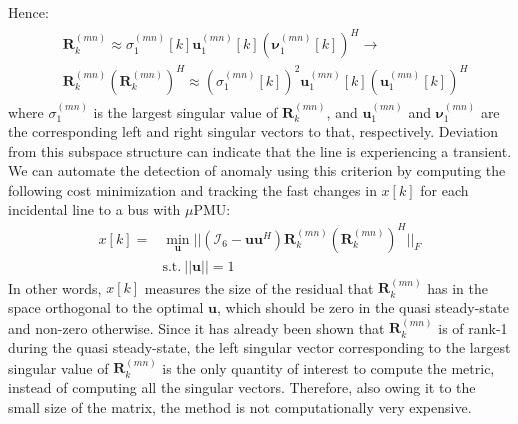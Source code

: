 \documentclass[twocolumn]{IEEEtran}
\newcommand{\mup}{\mu \text{PMU}}
\newcommand{\bs}{\boldsymbol}
\begin{document}
Hence:
\begin{align}
\begin{split}
&\bs R^{(mn)}_k \approx \sigma^{(mn)}_1[k]\bs u^{(mn)}_1[k] (\bs \nu^{(mn)}_1[k])^H\rightarrow \\
&\bs R^{(mn)}_k (\bs R_k ^{(mn)})^H\approx (\sigma^{(mn)}_1[k])^2\bs u^{(mn)}_1[k] (\bs u^{(mn)}_1[k])^H
\end{split}
\end{align}
where $\sigma^{(mn)}_1$ is the largest singular value of $\bs R^{(mn)}_k$, and $\bs{u}^{(mn)}_1$ and $\bs{\nu}^{(mn)}_1$ are the corresponding left and right singular vectors to that, respectively. Deviation from this subspace structure can indicate that the line is experiencing a transient. 
We can automate the detection of anomaly using this criterion by computing the following cost minimization and tracking the fast changes in $x[k]$ for each incidental line to a bus with $\mup$:
\begin{equation}
\begin{split}
x[k]=&\min_{\bs u} ||(\mathcal{I}_{6}-\bs u\bs u^H)\bs R^{(mn)}_k(\bs R^{(mn)}_k)^H||_{F}\\
&\mbox{s.t.}~||\bs u||=1
\end{split}
\label{eq:cost_one_upmu}
\end{equation}
In other words, $x[k]$ measures the size of the residual that $\bs R^{(mn)}_k$ has in the space orthogonal to the optimal $\bs u$, which should be zero in the quasi steady-state and non-zero otherwise. Since it has already been shown that $\bs R^{(mn)}_k$ is of rank-1 during the quasi steady-state, the left singular vector corresponding to the largest singular value of $\bs R^{(mn)}_k$ is the only  quantity of interest to compute the metric, instead of computing all the singular vectors. Therefore, also owing it to the small size of the matrix, the method is not computationally very expensive.
\end{document}
